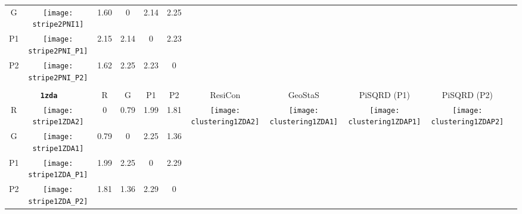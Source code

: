 \documentclass[a4paper,11pt,twoside]{book}%
\begin{document}
\begin{appendices}
\begin{sidewaystable}[h!]
\begin{tabular*}{4cm}{cc|c|c|c|c|c|c|c|c|c|}
\cline{1-6}
\multicolumn{1}{|c|}{G} & \texttt{[image: stripe2PNI1]} & 1.60 & 0 & 2.14 & 2.25 & \multirow{4}{*}{} & \multirow{4}{*}{} & \multirow{4}{*}{} & \multirow{4}{*}{} & \multirow{5}{*}{} \\
\cline{1-6}
\multicolumn{1}{|c|}{P1} & \texttt{[image: stripe2PNI\_P1]} & 2.15 & 2.14 & 0 & 2.23 & \multirow{4}{*}{} & \multirow{4}{*}{} & \multirow{4}{*}{} & \multirow{4}{*}{} & \multirow{5}{*}{}  \\
\cline{1-6}
\multicolumn{1}{|c|}{P2} & \texttt{[image: stripe2PNI\_P2]} & 1.62 & 2.25 & 2.23 & 0 & \multirow{4}{*}{} & \multirow{4}{*}{} & \multirow{4}{*}{} & \multirow{4}{*}{} & \multirow{5}{*}{}  \\
\cline{1-11}
\\
\cline{1-11}
\multicolumn{2}{|c|}{{\bf \texttt{1zda}}} & R & G & P1 & P2 & ResiCon & GeoStaS & PiSQRD (P1) & PiSQRD (P2) & \multirow{5}{*}{\vspace{-0.15cm}\texttt{[image: threeHistogram1ZDA]}}  \\
\cline{1-10}
\multicolumn{1}{|c|}{R} & \texttt{[image: stripe1ZDA2]} & 0 & 0.79 & 1.99 & 1.81 & \multirow{4}{*}{\vspace{-0.3cm}\texttt{[image: clustering1ZDA2]}} & \multirow{4}{*}{\vspace{-0.3cm}\texttt{[image: clustering1ZDA1]}} & \multirow{4}{*}{\vspace{-0.3cm}\texttt{[image: clustering1ZDAP1]}} & \multirow{4}{*}{\vspace{-0.3cm}\texttt{[image: clustering1ZDAP2]}} &  \multirow{5}{*}{} \\
\cline{1-6}
\multicolumn{1}{|c|}{G} & \texttt{[image: stripe1ZDA1]} & 0.79 & 0 & 2.25 & 1.36 & \multirow{4}{*}{} & \multirow{4}{*}{} & \multirow{4}{*}{} & \multirow{4}{*}{} & \multirow{5}{*}{} \\
\cline{1-6}
\multicolumn{1}{|c|}{P1} & \texttt{[image: stripe1ZDA\_P1]} & 1.99 & 2.25 & 0 & 2.29 & \multirow{4}{*}{} & \multirow{4}{*}{} & \multirow{4}{*}{} & \multirow{4}{*}{} & \multirow{5}{*}{}  \\
\cline{1-6}
\multicolumn{1}{|c|}{P2} & \texttt{[image: stripe1ZDA\_P2]} & 1.81 & 1.36 & 2.29 & 0 & \multirow{4}{*}{} & \multirow{4}{*}{} & \multirow{4}{*}{} & \multirow{4}{*}{} & \multirow{5}{*}{}  \\
\cline{1-11}
\end{tabular*}
\normalfont
\end{sidewaystable}




\end{appendices}
\end{document}
